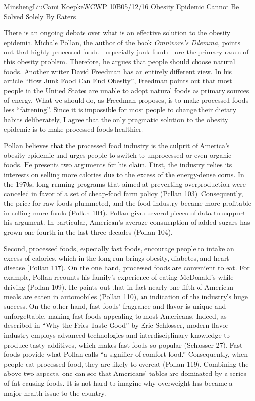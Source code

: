 \documentclass[12pt,letterpaper]{article}
\begin{document}
\begin{mla}{Minsheng}{Liu}{Cami Koepke}{WCWP 10B}{05/12/16}
  {Obesity Epidemic Cannot Be Solved Solely By Eaters}

There is an ongoing debate over what is an effective solution to the
obesity epidemic. Michale Pollan, the author of the book
\emph{Omnivore's Dilemma}, points out that highly processed
foods---especially junk foods---are the primary cause of this obesity
problem. Therefore, he argues that people should choose natural foods.
Another writer David Freedman has an entirely different view. In his
article ``How Junk Food Can End Obesity'', Freedman points out that most
people in the United States are unable to adopt natural foods as primary
sources of energy. What we should do, as Freedman proposes, is to make
processed foods less ``fattening''. Since it is impossible for most
people to change their dietary habits deliberately, I agree that the
only pragmatic solution to the obesity epidemic is to make processed
foods healthier.

Pollan believes that the processed food industry is the culprit of
America's obesity epidemic and urges people to switch to unprocessed or
even organic foods. He presents two arguments for his claim. First, the
industry relies its interests on selling more calories due to the excess
of the energy-dense corns. In the 1970s, long-running programs that
aimed at preventing overproduction were canceled in favor of a set of
cheap-food farm policy (Pollan 103). Consequently, the price for raw
foods plummeted, and the food industry became more profitable in selling
more foods (Pollan 104). Pollan gives several pieces of data to support
his argument. In particular, American's average consumption of added
sugars has grown one-fourth in the last three decades (Pollan 104).

Second, processed foods, especially fast foods, encourage people to
intake an excess of calories, which in the long run brings obesity,
diabetes, and heart disease (Pollan 117). On the one hand, processed
foods are convenient to eat. For example, Pollan recounts his family's
experience of eating McDonald's while driving (Pollan 109). He points
out that in fact nearly one-fifth of American meals are eaten in
automobiles (Pollan 110), an indication of the industry's huge success.
On the other hand, fast foods' fragrance and flavor is unique and
unforgettable, making fast foods appealing to most Americans. Indeed, as
described in ``Why the Fries Taste Good'' by Eric Schlosser, modern
flavor industry employs advanced technologies and interdisciplinary
knowledge to produce tasty additives, which makes fast foods so popular
(Schlosser 27). Fast foods provide what Pollan calls ``a signifier of
comfort food.'' Consequently, when people eat processed food, they are
likely to overeat (Pollan 119). Combining the above two aspects, one can
see that Americans' tables are dominated by a series of fat-causing
foods. It is not hard to imagine why overweight has became a major
health issue to the country.


\end{mla}
\end{document}
